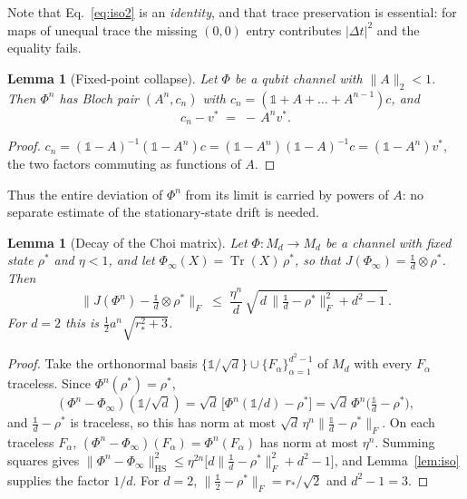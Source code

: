 \documentclass[11pt,a4paper]{article}
\newtheorem{lemma}[theorem]{Lemma}
\theoremstyle{definition}
\theoremstyle{remark}
\newcommand{\openone}{\mathbb{1}}%
\begin{document}
Note that Eq.~\eqref{eq:iso2} is an \emph{identity}, and that trace preservation
is essential: for maps of unequal trace the missing $(0,0)$ entry contributes
$|\Delta t|^2$ and the equality fails.

\begin{lemma}[Fixed-point collapse]\label{lem:collapse}
Let $\Phi$ be a qubit channel with $\|A\|_2<1$. Then $\Phi^n$ has Bloch pair
$(A^n,c_n)$ with $c_n=(\openone+A+\dots+A^{n-1})c$, and
\begin{equation}
  c_n-v^\ast \;=\; -\,A^{n}v^\ast .
\end{equation}
\end{lemma}

\begin{proof}
$c_n=(\openone-A)^{-1}(\openone-A^n)c=(\openone-A^n)(\openone-A)^{-1}c
 =(\openone-A^n)v^\ast$, the two factors commuting as functions of $A$.
\end{proof}

Thus the entire deviation of $\Phi^n$ from its limit is carried by powers of
$A$: no separate estimate of the stationary-state drift is needed.

\begin{lemma}[Decay of the Choi matrix]\label{lem:decay}
Let $\Phi:M_d\to M_d$ be a channel with fixed state $\rho^\ast$ and $\eta<1$,
and let $\Phi_\infty(X)=\operatorname{Tr}(X)\,\rho^\ast$, so that
$J(\Phi_\infty)=\tfrac{\openone}{d}\otimes\rho^\ast$. Then
\begin{equation}\label{eq:decay}
  \bigl\|J(\Phi^n)-\tfrac{\openone}{d}\otimes\rho^\ast\bigr\|_F
  \;\le\; \frac{\eta^{n}}{d}\,
  \sqrt{\,d\,\bigl\|\tfrac{\openone}{d}-\rho^\ast\bigr\|_F^{2}+d^{2}-1\,}.
\end{equation}
For $d=2$ this is $\tfrac12 a^{n}\sqrt{r_\ast^{2}+3}$.
\end{lemma}

\begin{proof}
Take the orthonormal basis $\{\openone/\sqrt d\}\cup\{F_\alpha\}_{\alpha=1}^{d^2-1}$
of $M_d$ with every $F_\alpha$ traceless. Since $\Phi^n(\rho^\ast)=\rho^\ast$,
\begin{equation}
 (\Phi^n-\Phi_\infty)(\openone/\sqrt d)=\sqrt d\,\bigl[\Phi^n(\openone/d)-\rho^\ast\bigr]
 =\sqrt d\,\Phi^n\!\bigl(\tfrac{\openone}{d}-\rho^\ast\bigr),
\end{equation}
and $\tfrac{\openone}{d}-\rho^\ast$ is traceless, so this has norm at most
$\sqrt d\,\eta^{n}\|\tfrac{\openone}{d}-\rho^\ast\|_F$. On each traceless
$F_\alpha$, $(\Phi^n-\Phi_\infty)(F_\alpha)=\Phi^n(F_\alpha)$ has norm at most
$\eta^n$. Summing squares gives
$\|\Phi^n-\Phi_\infty\|_{\mathrm{HS}}^2\le\eta^{2n}\bigl[d\|\tfrac{\openone}{d}-\rho^\ast\|_F^2+d^2-1\bigr]$,
and Lemma~\ref{lem:iso} supplies the factor $1/d$. For $d=2$,
$\|\tfrac{\openone}{2}-\rho^\ast\|_F=r_\ast/\sqrt2$ and $d^2-1=3$.
\end{proof}
\end{document}
